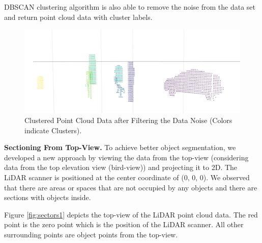 DBSCAN clustering algorithm is also able to remove the noise from the data set and return point cloud data with cluster labels.


\begin{figure}[!h]
\begin{center}
  \includegraphics[width=.55\linewidth]{./images/seg_noise_removal.png}
  \caption{Clustered Point Cloud Data after Filtering the Data Noise (Colors indicate Clusters). }
  \label{fig:ClusteringWithNoiseFiltering}
\end{center}
\end{figure}



\textbf{Sectioning From Top-View.}
To achieve better object segmentation, we developed a new approach by viewing the data from the top-view (considering data from the top elevation 
view (bird-view)) and projecting it to 2D. The LiDAR scanner is positioned at the center coordinate
of (0, 0, 0).  We observed that there are areas or spaces that are not occupied by any
objects and there are sections with objects inside.

Figure \ref{fig:sectors1} depicts the top-view of the LiDAR point cloud data.
The red point is the zero point which is the position of the LiDAR scanner. 
All other surrounding points are object points from the top-view.

